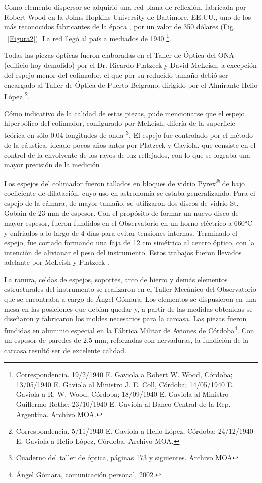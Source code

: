 \documentclass[baaa]{baaa}
\begin{document}
Como elemento dispersor se adquirió una red plana de reflexión, fabricada por Robert Wood en la Johns Hopkins University de Baltimore, EE.UU., uno de los más reconocidos fabricantes de la época \citep{dieke}, por un valor de 350 dólares (Fig. ~\ref{Figura2}). La red llegó al país a mediados de 1940 \footnote{Correspondencia. 19/2/1940 E. Gaviola a Robert W. Wood, Córdoba; 13/05/1940 E. Gaviola al Ministro J. E. Coll, Córdoba; 14/05/1940 E. Gaviola a R. W. Wood, Córdoba; 18/09/1940 E. Gaviola al Ministro Guillermo Rothe; 23/10/1940 E. Gaviola al Banco Central de la Rep. Argentina. Archivo MOA.}.

Todas las piezas ópticas fueron elaboradas en el Taller de Óptica del ONA (edificio hoy demolido) por el Dr. Ricardo Platzeck y David McLeish, a excepción del espejo menor del colimador, el que por su reducido tamaño debió ser encargado al Taller de Óptica de Puerto Belgrano, dirigido por el Almirante Helio López \footnote{Correspondencia. 5/11/1940 E. Gaviola a Helio López, Córdoba; 24/12/1940 E. Gaviola a Helio López, Córdoba. Archivo MOA.}.

Cómo indicativo de la calidad de estas piezas, pude mencionarse que el espejo hiperbólico del colimador, configurado por McLeish, difería de la superficie teórica en sólo 0.04 longitudes de onda \citep{gaviola1942a} \footnote{Cuaderno del taller de óptica, páginas 173 y siguientes. Archivo MOA}. El espejo fue controlado por el método de la cáustica, ideado pocos años antes por Platzeck y Gaviola, que consiste en el control de la envolvente de los rayos de luz reflejados, con lo que se lograba una mayor precisión de la medición \citep{Platzeck:39}.

Los espejos del colimador fueron tallados en bloques de vidrio Pyrex\textsuperscript{®} de bajo coeficiente de dilatación, cuyo uso  en astronomía se estaba generalizando. Para el espejo de la cámara, de mayor tamaño, se utilizaron dos discos de vidrio St. Gobain de 23 mm de espesor. Con el propósito de formar un nuevo disco de mayor espesor, fueron fundidos en el Observatorio en un horno eléctrico a 660°C y enfriados a lo largo de 4 días para evitar tensiones internas. Terminado el espejo, fue cortado formando una faja de 12 cm simétrica al centro óptico, con la intención de alivianar el peso del instrumento. Estos trabajos fueron llevados adelante por McLeish y Platzeck \citep{gaviola1942a}.

La ranura, celdas de espejos, soportes, arco de hierro y demás elementos estructurales del instrumento se realizaron en el Taller Mecánico del Observatorio que se encontraba a cargo de Ángel Gómara. Los elementos se dispusieron en una mesa en las posiciones que debían quedar y, a partir de las medidas obtenidas se diseñaron y fabricaron los moldes necesarios para la carcasa. Las piezas fueron fundidas en aluminio especial en la Fábrica Militar de Aviones de Córdoba\footnote{Ángel Gómara, comunicación personal, 2002.}. Con un espesor de paredes de 2.5 mm, reforzadas con nervaduras, la fundición de la carcasa resultó ser de excelente calidad. 
\end{document}
